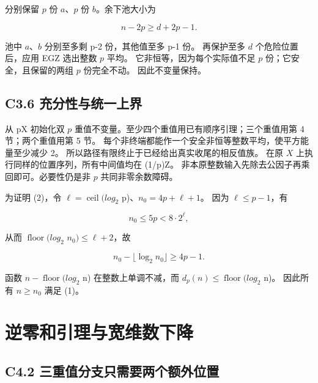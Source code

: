 {分别保留} {\ensuremath{p}} {份} {\ensuremath{a}、\ensuremath{p}} {份} {\ensuremath{b}。余下池大小为}

\[
n-2p\ge d+2p-1.
\]

{池中} {\ensuremath{a}、\ensuremath{b}} {分别至多剩} {p-2} {份，其他值至多} {p-1} {份。} {再保护至多} {\ensuremath{d}} {个危险位置后，应用} {EGZ} {选出整数} {\ensuremath{p}} {平均。} {它非恒等，因为每个实际值不足} {\ensuremath{p}} {份；它安全，且保留的两组} {\ensuremath{p}} {份完全不动。} {因此不变量保持。}

\subsection*{\texorpdfstring{{C3.6} {充分性与统一上界}}{C3.6 充分性与统一上界}}\label{C3-h19}

{从} {pX} {初始化双} {\ensuremath{p}} {重值不变量。至少四个重值用已有顺序引理；三个重值用第} {4} {节；两个重值用第} {5} {节。} {每个非终端都能作一个安全非恒等整数平均，使平方能量至少减少} {2。} {所以路径有限终止于已经给出真实收尾的相反值族。} {在原} {\ensuremath{X}} {上执行同样的位置序列，所有中间值均在} {(1/p)Z。} {非本原整数输入先除去公因子再乘回即可。必要性仍是非} {\ensuremath{p}} {共同非零余数障碍。}

{为证明} {(2)，令} {\ensuremath{\ell =\operatorname{ceil}(log_{2}}} {p)、\ensuremath{n_{0}=4p+\ell +1}。} {因为} {\ensuremath{\ell \le p-1}，有}

\[
n_0\le5p<8\cdot2^\ell,
\]

{从而} {\ensuremath{\operatorname{floor}(log_{2}}} {\ensuremath{n_{0})\le \ell +2}，故}

\[
n_0-\lfloor\log_2n_0\rfloor\ge4p-1.
\]

{函数} {\ensuremath{n-\operatorname{floor}(log_{2}}} {n)} {在整数上单调不减，而} {\ensuremath{d_{p}(n)\le \operatorname{floor}(log_{2}}} {n)。} {因此所有} {\ensuremath{n\ge n_{0}}} {满足} {(1)。}


\section{逆零和引理与宽维数下降}\label{construct:inverse-egz}
\subsection*{\texorpdfstring{{C4.2} {三重值分支只需要两个额外位置}}{C4.2 三重值分支只需要两个额外位置}}\label{C4-h20}

